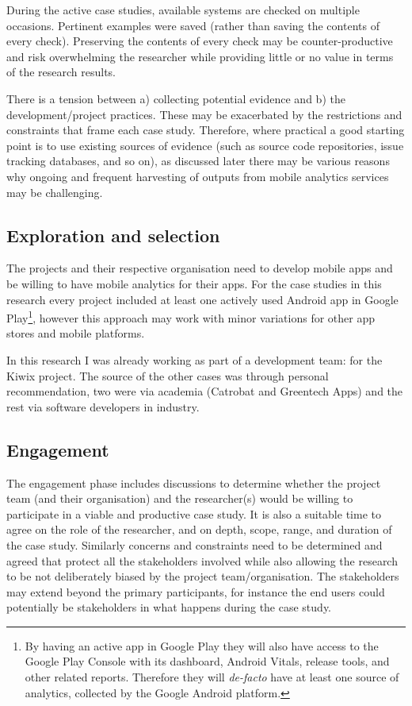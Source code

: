 During the active case studies, available systems are checked on multiple occasions. Pertinent examples were saved (rather than saving the contents of every check). Preserving the contents of every check may be counter-productive and risk overwhelming the researcher while providing little or no value in terms of the research results. 

There is a tension between a) collecting potential evidence and b) the development/project practices. These may be exacerbated by the restrictions and constraints that frame each case study. Therefore, where practical a good starting point is to use existing sources of evidence (such as source code repositories, issue tracking databases, and so on), as discussed later %
there may be various reasons why ongoing and frequent harvesting of outputs from mobile analytics services may be challenging.



\subsection{Exploration and selection}
The projects and their respective organisation need to develop mobile apps and be willing to have mobile analytics for their apps. For the case studies in this research every project included at least one actively used Android app in Google Play\footnote{By having an active app in Google Play they will also have access to the Google Play Console with its dashboard, Android Vitals, release tools, and other related reports. Therefore they will \emph{de-facto} have at least one source of analytics, collected by the Google Android platform.}, however this approach may work with minor variations for other app stores and mobile platforms.

In this research I was already working as part of a development team: for the Kiwix project. The source of the other cases was through personal recommendation, two were via academia (Catrobat and Greentech Apps) and the rest via software developers in industry.

\subsection{Engagement}
The engagement phase includes discussions to determine whether the project team (and their organisation) and the researcher(s) would be willing to participate in a viable and productive case study. It is also a suitable time to agree on the role of the researcher, and on depth, scope, range, and duration of the case study. Similarly concerns and constraints need to be determined and agreed that protect all the stakeholders involved while also allowing the research to be not deliberately biased by the project team/organisation. The stakeholders may extend beyond the primary participants, for instance the end users could potentially be stakeholders in what happens during the case study.


